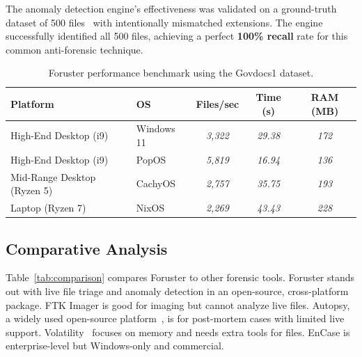 \documentclass[preprint,12pt,a4paper]{elsarticle}
\begin{document}
The anomaly detection engine's effectiveness was validated on a ground-truth 
dataset of 500 files~\cite{foruster_antiforensic_dataset} with intentionally 
mismatched extensions. The engine successfully identified all 500 files, 
achieving a perfect \textbf{100\% recall} rate for this common 
anti-forensic technique.

\begin{table}[h!]
\centering
\scriptsize
\caption{Foruster performance benchmark using the Govdocs1 dataset.}
\label{tab:performance}
\begin{tabular}{l|l|c|c|c}
\hline
\textbf{Platform} & \textbf{OS} & \textbf{Files/sec} & \textbf{Time (s)} & \textbf{RAM (MB)} \\
\hline
High-End Desktop (i9) & Windows 11 & \textit{3,322} & \textit{29.38} & \textit{172} \\
High-End Desktop (i9) & PopOS & \textit{5,819} & \textit{16.94} & \textit{136} \\
Mid-Range Desktop (Ryzen 5) & CachyOS & \textit{2,757} & \textit{35.75} & \textit{193} \\
Laptop (Ryzen 7) & NixOS & \textit{2,269} & \textit{43.43} & \textit{228} \\
\hline
\end{tabular}
\end{table}

\subsection{Comparative Analysis}

Table~\ref{tab:comparison} compares Foruster to other forensic tools. Foruster stands out with live file triage and anomaly detection in an open-source, cross-platform package. FTK Imager is good for imaging but cannot analyze live files. Autopsy, a widely used open-source platform~\cite{carrier2005file}, is for post-mortem cases with limited live support. Volatility~\cite{ligh2014art} focuses on memory and needs extra tools for files. EnCase is enterprise-level but Windows-only and commercial.
\end{document}
